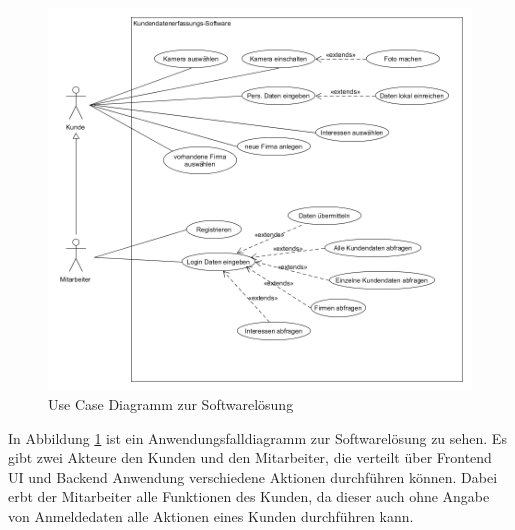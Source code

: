\begin{figure}[h]
	\centering
	\includegraphics[width=\linewidth]{Images/Projekt_Messe_UseCase2}
	\caption{Use Case Diagramm zur Softwarelösung}
	\label{fig:projektmesseusecase}
\end{figure}

In Abbildung \ref{fig:projektmesseusecase} ist ein Anwendungsfalldiagramm zur Softwarelösung zu sehen. Es gibt zwei Akteure den Kunden und den Mitarbeiter, die verteilt über Frontend UI und Backend Anwendung verschiedene Aktionen durchführen können. Dabei erbt der Mitarbeiter alle Funktionen des Kunden, da dieser auch ohne Angabe von Anmeldedaten alle Aktionen eines Kunden durchführen kann.

